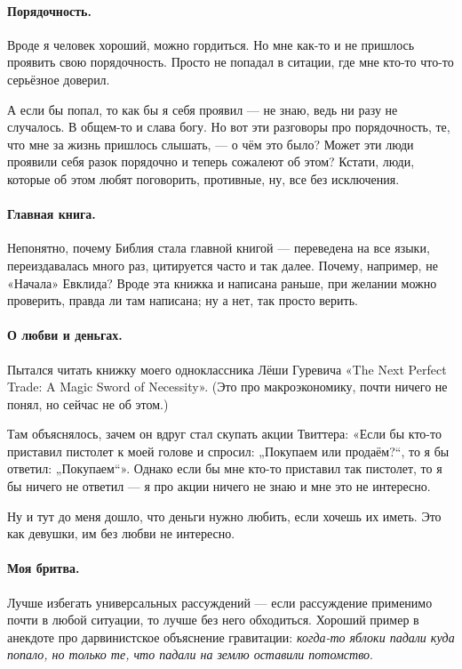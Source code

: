 \documentclass{book}
\begin{document}
\paragraph{Порядочность.}
Вроде я человек хороший, можно гордиться.
Но мне как-то и не пришлось проявить свою порядочность.
Просто не попадал в ситации, где мне кто-то что-то серьёзное доверил.

А если бы попал, то как бы я себя проявил --- не знаю, ведь ни разу не случалось.
В общем-то и слава богу.
Но вот эти разговоры про порядочность, те, что мне за жизнь пришлось слышать, --- о чём это было?
Может эти люди проявили себя разок порядочно и теперь сожалеют об этом?
Кстати, люди, которые об этом любят поговорить, противные, ну, все без исключения.

\paragraph{Главная книга.}
Непонятно, почему Библия стала главной книгой --- переведена на все языки, переиздавалась много раз, цитируется часто и так далее.
Почему, например, не «Начала» Евклида?
Вроде эта книжка и написана раньше, при желании можно проверить, правда ли там написана;
ну а нет, так просто верить.

\paragraph{О любви и деньгах.}
Пытался читать книжку моего одноклассника Лёши Гуревича «The Next Perfect Trade: A Magic Sword of Necessity».
(Это про макроэкономику, почти ничего не понял, но сейчас не об этом.)

Там объяснялось, зачем он вдруг стал скупать акции Твиттера: «Если бы кто-то приставил пистолет к моей голове и спросил: „Покупаем или продаём?“, то я бы ответил: „Покупаем“».
Однако если бы мне кто-то приставил так пистолет, то я бы ничего не ответил --- я про акции ничего не знаю и мне это не интересно.

Ну и тут до меня дошло, что деньги нужно любить, если хочешь их иметь.
Это как девушки, им без любви не интересно. 

\paragraph{Моя бритва.}
Лучше избегать универсальных рассуждений --- если рассуждение применимо почти в любой ситуации, то лучше без него обходиться.
Хороший пример в анекдоте про дарвинистское объяснение гравитации: \textit{когда-то яблоки падали куда попало, но только те, что падали на землю оставили потомство}.
\end{document}
